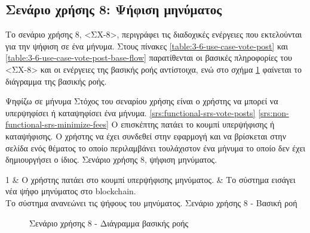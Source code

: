 \subsection{Σενάριο χρήσης 8: Ψήφιση μηνύματος} \label{subsection:3-6-use-case-vote-post}

Το σενάριο χρήσης 8, <ΣΧ-8>, περιγράφει τις διαδοχικές ενέργειες που εκτελούνται για την ψήφιση σε ένα μήνυμα. Στους πίνακες \ref{table:3-6-use-case-vote-post} και \ref{table:3-6-use-case-vote-post-base-flow} παρατίθενται οι βασικές πληροφορίες του <ΣΧ-8> και οι ενέργειες της βασικής ροής αντίστοιχα, ενώ στο σχήμα \ref{figure:3-6-use-case-vote-post-base-flow-sequence-diagram} φαίνεται το διάγραμμα της βασικής ροής.

\useCaseTable
{Ψηφίζω σε μήνυμα}
{Στόχος του σεναρίου χρήσης είναι ο χρήστης να μπορεί να υπερψηφίσει ή καταψηφίσει ένα μήνυμα.}
{\ref{srs:functional-srs-vote-posts}}
{\ref{srs:non-functional-srs-minimize-fees}}
{Ο επισκέπτης πατάει το κουμπί υπερψήφισης ή καταψήφισης.}
{Ο χρήστης να έχει συνδεθεί στην εφαρμογή και να βρίσκεται στην σελίδα ενός θέματος το οποίο περιλαμβάνει τουλάχιστον ένα μήνυμα το οποίο δεν έχει δημιουργήσει ο ίδιος.}
{Σενάριο χρήσης 8, ψήφιση μηνύματος.}
{\label{table:3-6-use-case-vote-post}}


\useCaseBaseFlowTable
{
    1 & Ο χρήστης πατάει στο κουμπί υπερψήφισης μηνύματος. & Το σύστημα εισάγει νέα ψήφο μηνύματος στο blockchain. \\ [0.5ex]
}
{Το σύστημα ανανεώνει τις ψήφους του μηνύματος.}
{Σενάριο χρήσης 8 - Βασική ροή}
{\label{table:3-6-use-case-vote-post-base-flow}}

\begin{figure}[H]
    \centering
    
    \caption{Σενάριο χρήσης 8 - Διάγραμμα βασικής ροής}
    \label{figure:3-6-use-case-vote-post-base-flow-sequence-diagram}
\end{figure}
